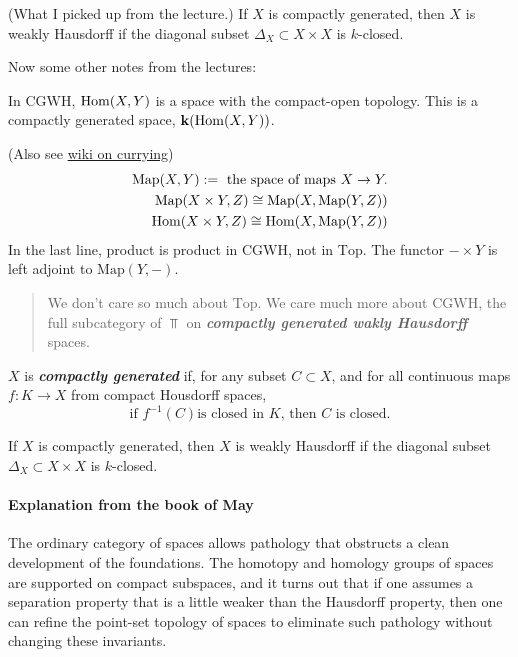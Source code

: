 (What I picked up from the lecture.) If $X$ is compactly generated, then $X$ is
weakly Hausdorff if the diagonal subset $\Delta_X\subset X\times X$ is
{\color{orange}$k$-closed}.

Now some other notes from the lectures:
	
In $\text{CGWH}$, $\mathop{\mathrm{Hom}}\nolimits(X,Y)$ is a space with the compact-open topology.
This is a compactly generated space, $\mathbf{k}(\mathop{\mathrm{Hom}}\nolimits(X,Y))$.

\begin{remark}
(Also see \href{https://en.wikipedia.org/wiki/Currying#Function_spaces}{wiki on currying})
\begin{align*}
\text{Map}(X,Y):=\text{ the space of maps }X\to Y.\\
\text{Map}(X\times Y,Z)\cong\text{Map}(X,\text{Map}(Y,Z))\\
\mathop{\mathrm{Hom}}\nolimits(X\times Y,Z)\cong \mathop{\mathrm{Hom}}\nolimits(X,\text{Map}(Y,Z))
\end{align*}
In the last line, product is product in $\text{CGWH}$, not in $\text{Top}$.
The functor $-\times Y$ is left adjoint to $\text{Map}(Y,-)$.

\begin{quotation}
We don't care so much about $\text{Top}$. We care much more about $\text{CGWH}$, the full subcategory of $\Top$ on \textbf{\textit{compactly generated wakly Hausdorff}} spaces.
\end{quotation}

\begin{definition}
	$X$ is \textbf{\textit{compactly generated}} if, for any subset $C\subset X$, and for all continuous maps $f:K\to X$ from compact Housdorff spaces, $$\text{if } f^{-1}(C) \text{is closed in }K\text{, then } C\text{ is closed}.$$
\end{definition}
\begin{claim}
	If $X$ is compactly generated, then $X$ is weakly Hausdorff if the diagonal subset $\Delta_X\subset X\times X$ is {\color{orange}$k$-closed}.
\end{claim}

\paragraph{Explanation from the book of May} The ordinary category of spaces
allows pathology that obstructs a clean development of the foundations. The
homotopy and homology groups of spaces are supported on compact subspaces, and
it turns out that if one assumes a separation property that is a little weaker
than the Hausdorff property, then one can refine the point-set topology of
spaces to eliminate such pathology without changing these invariants.
	

\end{remark}
